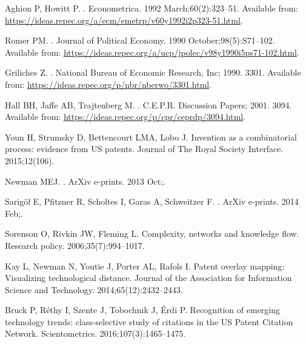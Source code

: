 \documentclass[10pt,A4,draft]{article}
\begin{document}
\begin{thebibliography}{10}

Aghion P, Howitt P.
.
\newblock Econometrica. 1992 March;60(2):323--51.
\newblock Available from:
  \url{https://ideas.repec.org/a/ecm/emetrp/v60y1992i2p323-51.html}.

Romer PM.
.
\newblock Journal of Political Economy. 1990 October;98(5):S71--102.
\newblock Available from:
  \url{https://ideas.repec.org/a/ucp/jpolec/v98y1990i5ps71-102.html}.

Griliches Z.
.
\newblock National Bureau of Economic Research, Inc; 1990. 3301.
\newblock Available from: \url{https://ideas.repec.org/p/nbr/nberwo/3301.html}.

Hall BH, Jaffe AB, Trajtenberg M.
.
\newblock C.E.P.R. Discussion Papers; 2001. 3094.
\newblock Available from: \url{https://ideas.repec.org/p/cpr/ceprdp/3094.html}.

Youn H, Strumsky D, Bettencourt LMA, Lobo J.
\newblock Invention as a combinatorial process: evidence from US patents.
\newblock Journal of The Royal Society Interface. 2015;12(106).

{Newman} MEJ.
.
\newblock ArXiv e-prints. 2013 Oct;.

{Sarig{\"o}l} E, {Pfitzner} R, {Scholtes} I, {Garas} A, {Schweitzer} F.
.
\newblock ArXiv e-prints. 2014 Feb;.

Sorenson O, Rivkin JW, Fleming L.
\newblock Complexity, networks and knowledge flow.
\newblock Research policy. 2006;35(7):994--1017.

Kay L, Newman N, Youtie J, Porter AL, Rafols I.
\newblock Patent overlay mapping: Visualizing technological distance.
\newblock Journal of the Association for Information Science and Technology.
  2014;65(12):2432--2443.

Bruck P, R{\'e}thy I, Szente J, Tobochnik J, {\'E}rdi P.
\newblock Recognition of emerging technology trends: class-selective study of
  citations in the US Patent Citation Network.
\newblock Scientometrics. 2016;107(3):1465--1475.


\end{thebibliography}
\end{document}
